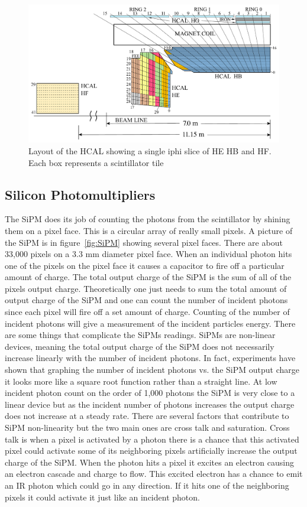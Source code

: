 \begin{figure}
\centering
\includegraphics[width=\linewidth]{Figures/Depthsegmentation.pdf}
\caption{Layout of the HCAL showing a single iphi slice of HE HB and HF. Each box represents a scintillator tile}
\label{fig:Depth}
\end{figure}


\subsection{Silicon Photomultipliers}
The SiPM does its job of counting the photons from the scintillator by shining them on a pixel face. This is a circular array of really small pixels. A picture of the SiPM is in figure~\ref{fig:SiPM} showing several pixel faces. There are about 33,000 pixels on a 3.3 mm diameter pixel face. When an individual photon hits one of the pixels on the pixel face it causes a capacitor to fire off a particular amount of charge. The total output charge of the SiPM is the sum of all of the pixels output charge. Theoretically one just needs to sum the total amount of output charge of the SiPM and one can count the number of incident photons since each pixel will fire off a set amount of charge. Counting of the number of incident photons will give a measurement of the incident particles energy. There are some things that complicate the SiPMs readings. SiPMs are non-linear devices, meaning the total output charge of the SiPM does not necessarily increase linearly with the number of incident photons. In fact, experiments have shown that graphing the number of incident photons vs. the SiPM output charge it looks more like a square root function rather than a straight line. At low incident photon count on the order of 1,000 photons the SiPM is very close to a linear device but as the incident number of photons increases the output charge does not increase at a steady rate. There are several factors that contribute to SiPM non-linearity but the two main ones are cross talk and saturation. Cross talk is when a pixel is activated by a photon there is a chance that this activated pixel could activate some of its neighboring pixels artificially increase the output charge of the SiPM. When the photon hits a pixel it excites an electron causing an electron cascade and charge to flow. This excited electron has a chance to emit an IR photon which could go in any direction. If it hits one of the neighboring pixels it could activate it just like an incident photon. 

